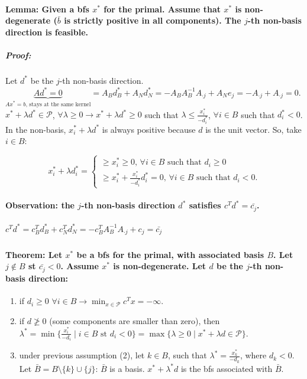 \documentclass[main]{subfiles}
\begin{document}
\paragraph{Lemma: Given a bfs $x^*$ for the primal. Assume that $x^*$ is
non-degenerate ($\bar{b}$ is strictly positive in all components).
The $j$-th non-basis direction is feasible.}

\subparagraph{Proof:}
Let $d^*$ be the $j$-th non-basis direction. $\underbrace{Ad^* = 0}_{Ax^* = b
\text{, stays at the same kernel}} = A_B d^*_B + A_N d^*_N =
-A_B A^{-1}_B A_{\cdot j} + A_N e_j = -A_{\cdot j} + A_{\cdot j } = 0$.\\

$x^* + \lambda d^* \in \mathcal{P}$, $\forall \lambda \geq 0 \rightarrow
x^* + \lambda d^* \geq 0$ such that $\lambda \leq \frac{x^*_i}{-d^*_i}$,
$\forall i \in B$ such that $d^*_i < 0$.\\

In the non-basis,  $x^*_i + \lambda d^*$ is always positive because $d$ is the
unit vector. So, take $i \in B$:

\[
  x^*_i + \lambda d^*_i =
  \left\{
	\begin{array}{ll}
    \geq x^*_i \geq 0 \text{, }\forall i \in B \text{ such that }d_i \geq 0\\
	\geq x^*_i + \frac{x^*_i}{-d^*_i} d^*_i = 0 \text{, } \forall i \in B
	\text{ such that } d_i < 0.
    \end{array}
  \right.
\]

\paragraph{Observation: the $j$-th non-basis direction $d^*$ satisfies
$c^T d^* = \bar{c_j}$.}

\subparagraph{$c^T d^* = c^T_B d^*_B + c^T_N d^*_N = -c^T_B A^{-1}_B
A_{\cdot j} + c_j = \bar{c_j}$}

\paragraph{Theorem: Let $x^*$ be a bfs for the primal, with associated basis
$B$. Let $j \notin B$ st $\bar{c_j} < 0$. Assume $x^*$ is non-degenerate.
Let $d$ be the $j$-th non-basis direction:}
\begin{enumerate}
\item if $d_i \geq 0$ $\forall i \in B \rightarrow \displaystyle \min_{x
\in \mathcal{P}} c^{T} x = -\infty$.
\item if $d \ngeq 0$ (some components are smaller than zero),
then $\lambda^* = \min \{\frac{x^*_i}{-d_i} \mid i \in B \text{ st } d_i < 0 \}
= \max \{\lambda \geq 0 \mid x^* + \lambda d \in \mathcal{P} \}$.
\item under previous assumption (2), let $k \in B$, such that
$\lambda^* = \frac{x^*_k}{-d_k}$, where $d_k < 0$. Let $\bar{B} =
B\setminus \{ k\} \cup \{j\}$:
\subitem $\bar{B}$ is a basis.
\subitem $x^* + \lambda^* d $ is the bfs associated with $\bar{B}$.
\end{enumerate}
\end{document}
